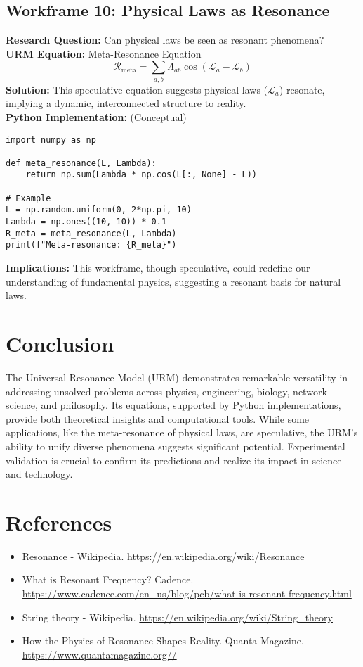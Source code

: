 \documentclass[12pt]{article}
\begin{document}
\clearpage

\subsection{Workframe 10: Physical Laws as Resonance}
\textbf{Research Question:} Can physical laws be seen as resonant phenomena? \\
\textbf{URM Equation:} Meta-Resonance Equation
\[
\mathcal{R}_{\text{meta}} = \sum_{a,b} \Lambda_{ab} \cos(\mathcal{L}_a - \mathcal{L}_b)
\]
\textbf{Solution:} This speculative equation suggests physical laws (\(\mathcal{L}_a\)) resonate, implying a dynamic, interconnected structure to reality. \\
\textbf{Python Implementation:} (Conceptual)
\begin{lstlisting}[caption={Meta-Resonance Conceptual Implementation}]
import numpy as np

def meta_resonance(L, Lambda):
    return np.sum(Lambda * np.cos(L[:, None] - L))

# Example
L = np.random.uniform(0, 2*np.pi, 10)
Lambda = np.ones((10, 10)) * 0.1
R_meta = meta_resonance(L, Lambda)
print(f"Meta-resonance: {R_meta}")
\end{lstlisting}
\textbf{Implications:} This workframe, though speculative, could redefine our understanding of fundamental physics, suggesting a resonant basis for natural laws.

\section{Conclusion}
The Universal Resonance Model (URM) demonstrates remarkable versatility in addressing unsolved problems across physics, engineering, biology, network science, and philosophy. Its equations, supported by Python implementations, provide both theoretical insights and computational tools. While some applications, like the meta-resonance of physical laws, are speculative, the URM's ability to unify diverse phenomena suggests significant potential. Experimental validation is crucial to confirm its predictions and realize its impact in science and technology.

\clearpage

\section{References}
\begin{itemize}
    \item Resonance - Wikipedia. \url{https://en.wikipedia.org/wiki/Resonance}
    \item What is Resonant Frequency? Cadence. \url{https://www.cadence.com/en_us/blog/pcb/what-is-resonant-frequency.html}
    \item String theory - Wikipedia. \url{https://en.wikipedia.org/wiki/String_theory}
    \item How the Physics of Resonance Shapes Reality. Quanta Magazine. \url{https://www.quantamagazine.org//}
\end{itemize}
\end{document}
